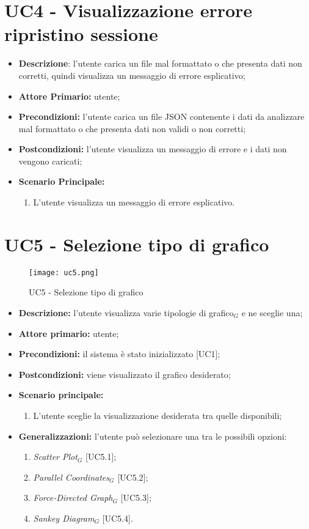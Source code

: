 \section{UC4 - Visualizzazione errore ripristino sessione}
\begin{itemize}
  \item \textbf{Descrizione}: l'utente carica un file mal formattato o che presenta dati non corretti, quindi visualizza un messaggio di errore esplicativo;
  \item \textbf{Attore Primario:} utente;
  \item \textbf{Precondizioni:} l’utente carica un file JSON contenente i dati da analizzare mal formattato o che presenta dati non validi o non corretti;
  \item \textbf{Postcondizioni:} l'utente visualizza un messaggio di errore e i dati non vengono caricati;
  \item \textbf{Scenario Principale:}
  \begin{enumerate}
    \item L'utente visualizza un messaggio di errore esplicativo.
  \end{enumerate}
\end{itemize}

\section{UC5 - Selezione tipo di grafico}
\begin{figure}[H]
 \texttt{[image: uc5.png]}
 \caption{UC5 - Selezione tipo di grafico}
\end{figure}

 \begin{itemize}
     \item \textbf{Descrizione:} l'utente visualizza varie tipologie di grafico$_G$ e ne sceglie una;
     \item \textbf{Attore primario:} utente;
     \item \textbf{Precondizioni:} il sistema è stato inizializzato [UC1];
     \item \textbf{Postcondizioni:} viene visualizzato il grafico desiderato;
     \item \textbf{Scenario principale:}
     \begin{enumerate}
       \item L'utente sceglie la visualizzazione desiderata tra quelle disponibili;
     \end{enumerate}
     \item \textbf{Generalizzazioni:} l'utente può selezionare una tra le possibili opzioni:
     \begin{enumerate}
         \item \textit{Scatter Plot}$_G$ [UC5.1];
         \item \textit{Parallel Coordinates}$_G$ [UC5.2];
         \item \textit{Force-Directed Graph}$_G$ [UC5.3];
         \item \textit{Sankey Diagram}$_G$ [UC5.4].
     \end{enumerate}
 \end{itemize}

